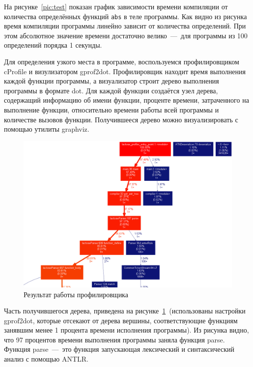 \documentclass[12pt,a4paper,oneside]{extarticle}
\begin{document}
        На рисунке~\ref{pic:test} показан график зависимости времени компиляции от количества определённых функций \lstinline$abs$ в теле программы. Как видно из рисунка время компиляции программы линейно зависит от количества определений. При этом абсолютное значение времени достаточно велико~---~для программы из 100 определений порядка 1 секунды.

        Для определения узкого места в программе, воспользуемся профилировщиком cProfile и визулизатором gprof2dot.
        Профилировщик находит время выполнения каждой функции программы, а визуализатор строит дерево выполнения программы в формате dot.
        Для каждой функции создаётся узел дерева, содержащий информацию об имени функции, проценте времени, затраченного на выполнение функции, относительно времени работы всей программы и количестве вызовов функции.
        Получившееся дерево можно визуализировать с помощью утилиты graphviz.

        \begin{figure}[h!]
            \center
            \includegraphics[scale=0.45]{lactose_stats.png}
            \caption{Результат работы профилировщика}
            \label{pic:stats}
        \end{figure}

        Часть получившегося дерева, приведена на рисунке~\ref{pic:stats}~(использованы настройки gprof2dot, которые отсекают от дерева вершины, соответствующие функциям занявшим менее 1 процента времени исполнения программы).
        Из рисунка видно, что 97 процентов времени выполнения программы заняла функция parse. Функция parse~---~это функция запускающая лексический и синтаксический анализ с помощью ANTLR.
\end{document}
